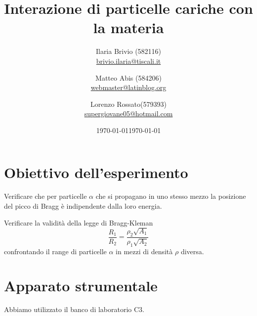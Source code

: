 \documentclass[italian,a4paper]{article}
\renewcommand{\a}{\alpha}
\renewcommand{\r}{\rho}
\begin{document}
\title{Interazione di particelle cariche con la materia}
\author{\normalsize Ilaria Brivio (582116)\\%
\normalsize \url{brivio.ilaria@tiscali.it}%
\and %
\normalsize Matteo Abis (584206)\\ %
\normalsize \url{webmaster@latinblog.org}
\date{\today}
\and
\normalsize Lorenzo Rossato(579393)\\ %
\normalsize \url{supergiovane05@hotmail.com}}
\date{\today}
\maketitle
\section{Obiettivo dell'esperimento}
Verificare che per particelle $\a$ che si propagano in uno stesso mezzo la posizione del picco di Bragg \`e indipendente dalla loro energia.

Verificare la validit\`a della legge di Bragg-Kleman
\begin{equation*}
\frac{R_1}{R_2} = \frac{\r_2 \sqrt{A_1}}{\rho_1 \sqrt{A_2}}
\end{equation*}
confrontando il range di particelle $\a$ in mezzi di densit\`a $\r$ diversa.
\section{Apparato strumentale}
Abbiamo utilizzato il banco di laboratorio C3.
\end{document}
